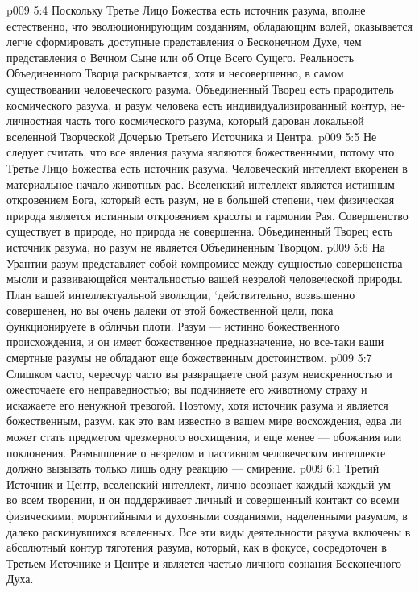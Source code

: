 \vs p009 5:4 \pc Поскольку Третье Лицо Божества есть источник разума, вполне естественно, что эволюционирующим созданиям, обладающим волей, оказывается легче сформировать доступные представления о Бесконечном Духе, чем представления о Вечном Сыне или об Отце Всего Сущего. Реальность Объединенного Творца раскрывается, хотя и несовершенно, в самом существовании человеческого разума. Объединенный Творец есть прародитель космического разума, и разум человека есть индивидуализированный контур, не\hyp{}личностная часть того космического разума, который дарован локальной вселенной Творческой Дочерью Третьего Источника и Центра.
\vs p009 5:5 \pc Не следует считать, что все явления разума являются божественными, потому что Третье Лицо Божества есть источник разума. Человеческий интеллект вкоренен в материальное начало животных рас. Вселенский интеллект является истинным откровением Бога, который есть разум, не в большей степени, чем физическая природа является истинным откровением красоты и гармонии Рая. Совершенство существует в природе, но природа не совершенна. Объединенный Творец есть источник разума, но разум не является Объединенным Творцом.
\vs p009 5:6 На Урантии разум представляет собой компромисс между сущностью совершенства мысли и развивающейся ментальностью вашей незрелой человеческой природы. План вашей интеллектуальной эволюции, `действительно, возвышенно совершенен, но вы очень далеки от этой божественной цели, пока функционируете в обличьи плоти. Разум --- истинно божественного происхождения, и он имеет божественное предназначение, но все\hyp{}таки ваши смертные разумы не обладают еще божественным достоинством.
\vs p009 5:7 Слишком часто, чересчур часто вы развращаете свой разум неискренностью и ожесточаете его неправедностью; вы подчиняете его животному страху и искажаете его ненужной тревогой. Поэтому, хотя источник разума и является божественным, разум, как это вам известно в вашем мире восхождения, едва ли может стать предметом чрезмерного восхищения, и еще менее --- обожания или поклонения. Размышление о незрелом и пассивном человеческом интеллекте должно вызывать только лишь одну реакцию --- смирение.
\vs p009 6:1 Третий Источник и Центр, вселенский интеллект, лично осознает каждый  каждый ум --- во всем творении, и он поддерживает личный и совершенный контакт со всеми физическими, моронтийными и духовными созданиями, наделенными разумом, в далеко раскинувшихся вселенных. Все эти виды деятельности разума включены в абсолютный контур тяготения разума, который, как в фокусе, сосредоточен в Третьем Источнике и Центре и является частью личного сознания Бесконечного Духа.
